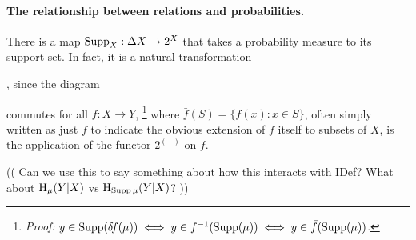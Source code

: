 \paragraph{The relationship between relations and probabilities.}
There is a map $\operatorname{\mathrm{Supp}}_X : \Delta X \to 2^X$ that takes a probability measure to its support set.  In fact, it is a natural transformation
\begin{center}
,
    \qquad
    since the diagram
    \qquad
{}
\end{center}
commutes for all $f : X \to Y$,%
\unskip\footnote{\textit{Proof:} 
$
    y \in \operatorname{\mathrm{Supp}}(\delta\!f(\mu)) 
    \iff y \in f^{-1}( \operatorname{\mathrm{Supp}}(\mu))
    \iff y \in \bar f(\operatorname{\mathrm{Supp}}(\mu))
$.
}
where
$\bar f(S) = \{ f(x) : x \in S\}$, often simply written as just $f$ to indicate the obvious extension of $f$ itself to subsets of $X$, is the application of the functor $2^{(-)}$ on $f$.


(( Can we use this to say something about how this interacts with IDef? What about $\operatorname{\mathrm{H}}_\mu(Y|X)$ vs $\operatorname{\mathrm{H}}_{\operatorname{\mathrm{Supp}} \mu}(Y|X)$? ))
